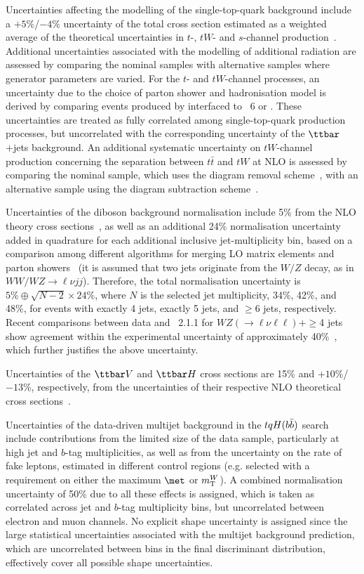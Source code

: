 Uncertainties affecting the modelling of the single-top-quark background include a 
$+5\%$/$-4\%$ uncertainty of the total cross section estimated as a weighted average 
of the theoretical uncertainties in $t$-, $tW$- and $s$-channel production~\cite{Kidonakis:2011wy,Kidonakis:2010ux,Kidonakis:2010tc}.
Additional uncertainties associated with the modelling of additional radiation are assessed by comparing the nominal
samples with alternative samples where generator parameters are varied.
For the $t$- and $tW$-channel processes, an uncertainty due to the choice of parton shower and hadronisation model is derived 
by comparing events produced by {\powheg} interfaced to {\pythia}~6 or {\herwigpp}.
These uncertainties are treated as fully correlated among single-top-quark production processes, but uncorrelated with the
corresponding uncertainty of the $\ttbar$+jets background.
An additional systematic uncertainty on $tW$-channel production concerning the separation 
between $t\bar{t}$ and $tW$ at NLO is assessed by comparing
the nominal sample, which uses the diagram removal scheme~\cite{Frixione:2008yi}, with an alternative sample
using the diagram subtraction scheme~\cite{Frixione:2008yi}.

Uncertainties of the diboson background normalisation include 5\% from the NLO theory cross sections~\cite{Campbell:1999ah},
as well as an additional 24\% normalisation uncertainty added in quadrature for each additional inclusive jet-multiplicity bin, based on a 
comparison among different algorithms for merging LO matrix elements and parton showers~\cite{Alwall:2007fs}
(it is assumed that two jets originate from the $W/Z$ decay, as in $WW/WZ \to \ell \nu jj$). 
Therefore, the total normalisation uncertainty is $5\% \oplus \sqrt{N-2}\times 24\%$, where $N$ is the selected jet multiplicity,  
34\%, 42\%, and 48\%, for events with exactly 4 jets, exactly 5 jets, and $\geq$6 jets, respectively.
Recent comparisons between data and {\sherpa}~2.1.1 for $WZ(\to \ell\nu\ell\ell) + \geq$4 jets show
agreement within the experimental uncertainty of approximately 40\%~\cite{Aaboud:2016yus}, which further justifies the above uncertainty.

Uncertainties of the $\ttbar V$ and $\ttbar H$ cross sections are 15\% and $+10\%$/$-13\%$, respectively,
from the uncertainties of their respective NLO theoretical cross sections~\cite{Campbell:2012dh,Garzelli:2012bn,deFlorian:2016spz}. 

Uncertainties of the data-driven multijet background in the $tqH(b\bar{b})$ search include
contributions from the limited size of the data sample, particularly at high jet and $b$-tag multiplicities, as 
well as from the uncertainty on the rate of fake leptons, estimated in 
different control regions (e.g. selected with a requirement on either the maximum $\met$ or $m_{\mathrm T}^W$). 
A combined normalisation uncertainty of 50\% due 
to all these effects is assigned, which is taken as correlated across jet
and $b$-tag multiplicity bins, but uncorrelated between electron and muon channels. 
No explicit shape uncertainty is assigned since the large statistical uncertainties associated with
the multijet background prediction, which are uncorrelated 
between bins in the final discriminant distribution, effectively cover all possible shape uncertainties. 

